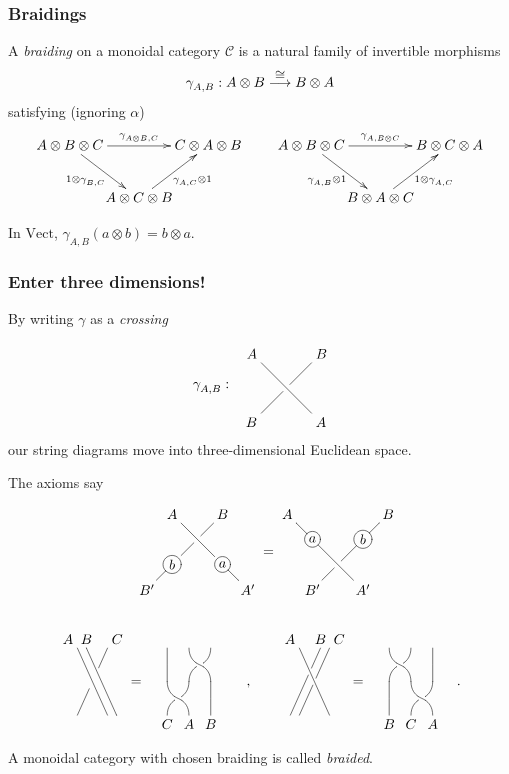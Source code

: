 \documentclass{beamer}
\newcommand{\lra}{\longrightarrow}
\def\CC{{\mathscr C}}
\begin{document}
\begin{frame}
\frametitle{Braidings}
A \textit{braiding} on a monoidal category $\CC$ is a natural family of invertible morphisms 
\[
\gamma^{}_{A,B} : A \otimes B  \stackrel{\mbox{{\small  $\cong$}}}{\lra} 
 B \otimes A
\]
satisfying (ignoring $\alpha$)
\[
 \xymatrix @C-10mm{
A \otimes B \otimes C \ar[rr]^{\gamma_{A\otimes B,C}^{}} \ar[rd]_-{1\otimes \gamma_{B,C}^{}} 
& & C \otimes A \otimes B  \\
& A \otimes C \otimes B\ar[ru]_-{\gamma_{A,C}^{} \otimes 1}}  
 \qquad 
\xymatrix @C-10mm{
A \otimes B \otimes C \ar[rr]^{\gamma_{A, B\otimes C}^{}} \ar[rd]_-{\gamma_{A,B}^{} \otimes 1} 
& & B \otimes C \otimes A  \\
& B \otimes A \otimes C \ar[ru]_-{1\otimes \gamma_{A,C}^{}}}   
\]

\begin{example}
In $\mathrm{Vect}$, $\gamma^{}_{A,B} (a\otimes b) = b \otimes a$.
\end{example}
\end{frame}
\begin{frame}

\frametitle{Enter three dimensions!}
By writing $\gamma$ as a \emph{crossing}
\[
\xygraph{
 []{\gamma^{}_{A,B} :} [r][u(0.5)] *+!DR{A}( !{\xunderv}, [r]*+!DL{B} , [dr]*+!UL{A} ,  [d]*+!UR{B} )}
\]
our string diagrams move into three-dimensional Euclidean space.   

The axioms say
\[
\xygraph{[u(.75)]*+{A} ( [r]*+{B} , [d(1.5)l(.5)]*+{B'} , [dr(1.5)]*+{A'},
  [d]*++=[o][Fo]{b}="b"-"B'" , [dr]*++=[o][Fo]{a}="a"-"A'" ,
!{\xunderv ~{"A"}{"B"}{"b"}{"a"}} 
  )}  = 
\xygraph{[u(.75)]*+{A} ( [rr]*+{B} , [d(1.5)r(.5)]*+{B'} , [dr(1.5)]*+{A'},
  [dr(.5)r]*++=[o][Fo]{b}="b"-"B" , [dr(.5)]*++=[o][Fo]{a}="a"-"A" ,
!{\xunderv ~{"a"}{"b"}{"B'"}{"A'"}} 
  )}  
\]
\end{frame}
\begin{frame}
\[
\xygraph{ !{\knotholesize{15pt}}
!{/r1.8pc/: /u4pc/::}
[d(.5)] ( ?*+!DR{A} , [r] *+!DL{C}
 , !{\xunderv @(.45)}
, [r(.3)] ( ?*+!D{B} , ?- [rd]
))
}
=
\xygraph{
!{/r1.3pc/: /u2pc/::}
 !{\xcapv-@(0)}
!{\vtwistneg} ( []*+!U{C}  [r]*+!U{A}  [r]*+!U{B} ,
[uur] !{\vtwistneg}
[r]!{\xcapv@(0)}
)
}
\quad,\qquad
\xygraph{ %
!{/r1.8pc/: /u4pc/::}
[d(.5)] ( ?*+!DR{A} , [r(.7)] *+!D{B}  , [r] *+!DL{C} ,
!{\xunderv}
, [r(.7)] - [ld] |(.35)*{\khole}
}
= 
\xygraph{
!{/r1.3pc/: /u2pc/::}
[r] !{\vtwistneg}
!{\xcapv-@(0)}
[uurr]
!{\xcapv@(0)}
[l] !{\vtwistneg} 
[l]*+!U{B}  [r]*+!U{C}  [r]*+!U{A} 
}\,.
\]
\bigskip

A monoidal category with chosen braiding is called \emph{braided}.
\end{frame}
\end{document}

